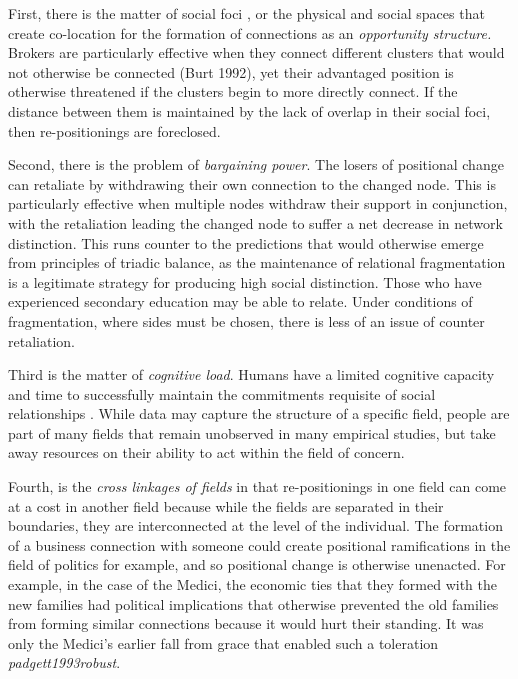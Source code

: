 \documentclass[12pt]{article}
\begin{document}
First, there is the matter of social foci \citep{feld1981focused}, or the physical and social spaces that create co-location for the formation of connections as an \textit{opportunity structure.} Brokers are particularly effective when they connect different clusters that would not otherwise be connected (Burt 1992), yet their advantaged position is otherwise threatened if the clusters begin to more directly connect. If the distance between them is maintained by the lack of overlap in their social foci, then re-positionings are foreclosed.   

Second, there is the problem of \textit{bargaining power}. The losers of positional change can retaliate by withdrawing their own connection to the changed node. This is particularly effective when multiple nodes withdraw their support in conjunction, with the retaliation leading the changed node to suffer a net decrease in network distinction. This runs counter to the predictions that would otherwise emerge from principles of triadic balance, as the maintenance of relational fragmentation is a legitimate strategy for producing high social distinction. Those who have experienced secondary education may be able to relate. Under conditions of fragmentation, where sides must be chosen, there is less of an issue of counter retaliation.

Third is the matter of \textit{cognitive load}. Humans have a limited cognitive capacity and time to successfully maintain the commitments requisite of social relationships \citep{dunbar1995neocortex}. While data may capture the structure of a specific field, people are part of many fields that remain unobserved in many empirical studies, but take away resources on their ability to act within the field of concern.

Fourth, is the \textit{cross linkages of fields} in that re-positionings in one field can come at a cost in another field because while the fields are separated in their boundaries, they are interconnected at the level of the individual. The formation of a business connection with someone could create positional ramifications in the field of politics for example, and so positional change is otherwise unenacted. For example, in the case of the Medici, the economic ties that they formed with the new families had political implications that otherwise prevented the old families from forming similar connections because it would hurt their standing. It was only the Medici's earlier fall from grace that enabled such a toleration \textit{padgett1993robust}.  
\end{document}
